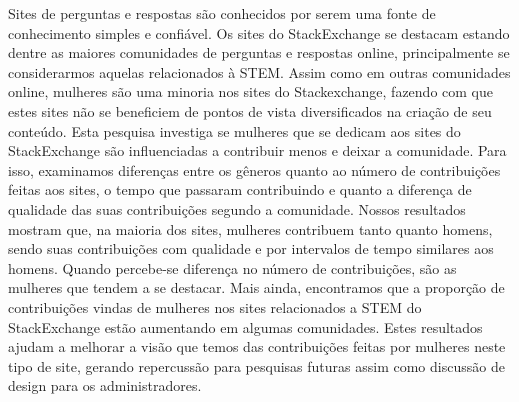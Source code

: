 Sites de perguntas e respostas são conhecidos por serem uma fonte de conhecimento simples e confiável. Os sites do StackExchange se destacam estando dentre as maiores comunidades de perguntas e respostas online, principalmente se considerarmos aquelas relacionados à STEM. Assim como em outras comunidades online, mulheres são uma minoria nos sites do Stackexchange, fazendo com que estes sites não se beneficiem de pontos de vista diversificados na criação de seu conteúdo. Esta pesquisa investiga se mulheres que se dedicam aos sites do StackExchange são influenciadas a contribuir menos e deixar a comunidade. Para isso, examinamos diferenças entre os gêneros quanto ao número de contribuições feitas aos sites, o tempo que passaram contribuindo e quanto a diferença de qualidade das suas contribuições segundo a comunidade. Nossos resultados mostram que, na maioria dos sites, mulheres contribuem tanto quanto homens, sendo suas contribuições com qualidade e por intervalos de tempo similares aos homens. Quando percebe-se diferença no número de contribuições, são as mulheres que tendem a se destacar. Mais ainda, encontramos que a proporção de contribuições vindas de mulheres nos sites relacionados a STEM do StackExchange estão aumentando em algumas comunidades. Estes resultados ajudam a melhorar a visão que temos das contribuições feitas por mulheres neste tipo de site, gerando repercussão para pesquisas futuras assim como discussão de design para os administradores.